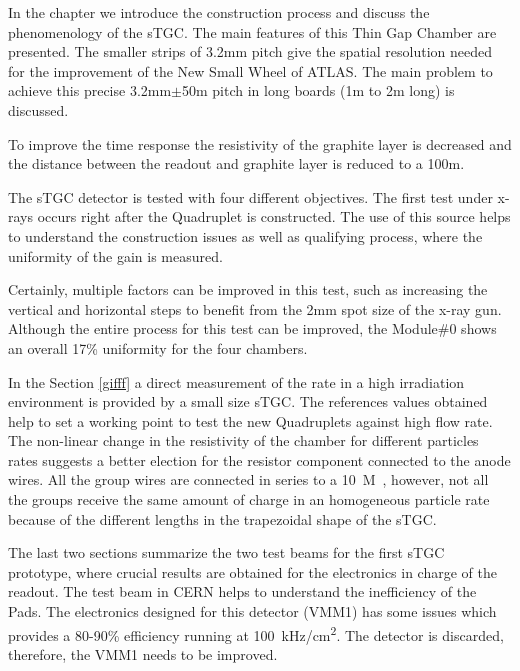 In the chapter we introduce the construction process and discuss the phenomenology of the sTGC. The main features of
this Thin Gap Chamber are presented. The smaller strips of 3.2mm pitch give the spatial resolution needed for the
improvement of the New Small Wheel of ATLAS. The main problem to achieve this precise 3.2mm$\pm$50\micro m pitch in long
boards (1m to 2m long) is discussed.\par
To improve the time response the resistivity of the graphite layer is decreased and the distance between the readout and
graphite layer is reduced to a 100\micro m.\par

The sTGC detector is tested with four different objectives. The first test under x-rays occurs right after the Quadruplet is
constructed. The use of this source helps to understand the construction issues as well as qualifying process, where
the uniformity of the gain is measured.\par

Certainly, multiple factors can be improved in this test, such as increasing the vertical and horizontal steps to benefit from the 2mm spot size of the x-ray gun. 
Although the entire process for this test can be improved, the Module\#0 shows an overall 17\% uniformity for the four
chambers.\par

In the Section \ref{gifff} a direct measurement of the rate in a high irradiation environment is provided by a small size
sTGC. The references values obtained help to set a working point to test the new Quadruplets against high flow rate.
The non-linear change in the resistivity of the chamber for different particles rates suggests a better election for the
resistor component connected to the anode wires. All the group wires are connected in series to a \SI{10}{M\Omega},
however, not all the groups receive the same amount of charge in an homogeneous particle rate because of the different
lengths in the trapezoidal shape of the sTGC. \par

The last two sections summarize the two test beams for the first sTGC prototype, where crucial results are obtained for
the electronics in charge of the readout. The test beam in CERN helps to understand the inefficiency of the Pads.
The electronics designed for this detector (VMM1) has some issues which provides a 80-90\% efficiency running at
\SI{100}{kHz/\cm^2}. The detector is discarded, therefore, the VMM1 needs to be improved. \par

